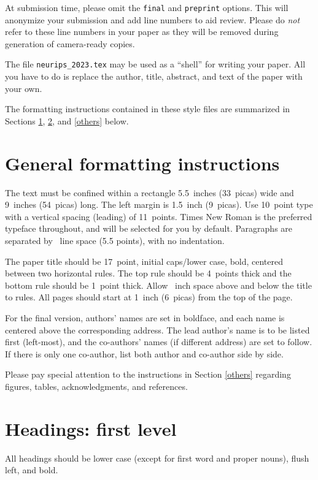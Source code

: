 \documentclass{article}
\begin{document}
\begin{CJK}{UTF8}{gbsn}
At submission time, please omit the \verb+final+ and \verb+preprint+
options. This will anonymize your submission and add line numbers to aid
review. Please do \emph{not} refer to these line numbers in your paper as they
will be removed during generation of camera-ready copies.


The file \verb+neurips_2023.tex+ may be used as a ``shell'' for writing your
paper. All you have to do is replace the author, title, abstract, and text of
the paper with your own.


The formatting instructions contained in these style files are summarized in
Sections \ref{gen_inst}, \ref{headings}, and \ref{others} below.


\section{General formatting instructions}
\label{gen_inst}


The text must be confined within a rectangle 5.5~inches (33~picas) wide and
9~inches (54~picas) long. The left margin is 1.5~inch (9~picas).  Use 10~point
type with a vertical spacing (leading) of 11~points.  Times New Roman is the
preferred typeface throughout, and will be selected for you by default.
Paragraphs are separated by ~line space (5.5 points), with no
indentation.


The paper title should be 17~point, initial caps/lower case, bold, centered
between two horizontal rules. The top rule should be 4~points thick and the
bottom rule should be 1~point thick. Allow ~inch space above and
below the title to rules. All pages should start at 1~inch (6~picas) from the
top of the page.


For the final version, authors' names are set in boldface, and each name is
centered above the corresponding address. The lead author's name is to be listed
first (left-most), and the co-authors' names (if different address) are set to
follow. If there is only one co-author, list both author and co-author side by
side.


Please pay special attention to the instructions in Section \ref{others}
regarding figures, tables, acknowledgments, and references.


\section{Headings: first level}
\label{headings}


All headings should be lower case (except for first word and proper nouns),
flush left, and bold.



\end{CJK}
\end{document}
